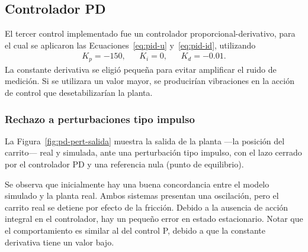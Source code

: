 \subsection{Controlador PD}

El tercer control implementado fue un controlador proporcional-derivativo, para el cual se aplicaron las Ecuaciones~\eqref{eq:pid-u} y~\eqref{eq:pid-id}, utilizando
\begin{align*}
    K_p = -150, && K_i = 0, && K_d = -0.01.
\end{align*}
La constante derivativa se eligió pequeña para evitar amplificar el ruido de medición. Si se utilizara un valor mayor, se producirían vibraciones en la acción de control que desetabilizarían la planta.

\subsubsection{Rechazo a perturbaciones tipo impulso}

La Figura~\ref{fig:pd-pert-salida} muestra la salida de la planta ---la posición del carrito--- real y simulada, ante una perturbación tipo impulso, con el lazo cerrado por el controlador PD y una referencia nula (punto de equilibrio).


Se observa que inicialmente hay una buena concordancia entre el modelo simulado y la planta real. Ambos sistemas presentan una oscilación, pero el carrito real se detiene por efecto de la fricción. Debido a la ausencia de acción integral en el controlador, hay un pequeño error en estado estacionario. Notar que el comportamiento es similar al del control P, debido a que la constante derivativa tiene un valor bajo.


